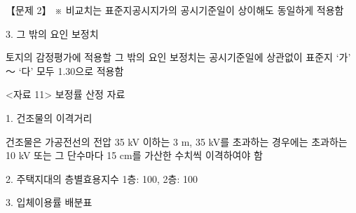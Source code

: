 \begin{longquestion}{【문제 2】}
※ 비교치는 표준지공시지가의 공시기준일이 상이해도 동일하게 적용함 \par
3. 그 밖의 요인 보정치 \par
토지의 감정평가에 적용할 그 밖의 요인 보정치는 공시기준일에 상관없이 표준지 ‘가’ ～ ‘다’ 모두 1.30으로 적용함 \par
<자료 11> 보정률 산정 자료 \par
1. 건조물의 이격거리 \par
건조물은 가공전선의 전압 35 kV 이하는 3 m, 35 kV를 초과하는 경우에는 초과하는 10 kV 또는 그 단수마다 15 cm를 가산한 수치씩 이격하여야 함 \par
2. 주택지대의 층별효용지수 1층: 100, 2층: 100 \par
3. 입체이용률 배분표 \par
{\small\centering
{}\par}


\end{longquestion}
